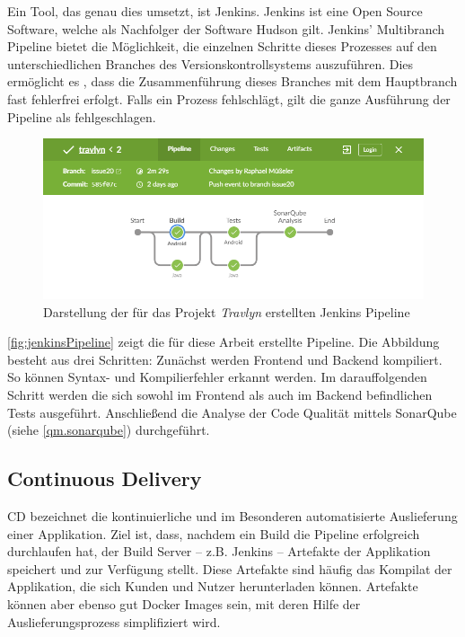 			Ein Tool, das genau dies umsetzt, ist Jenkins. Jenkins ist eine Open Source Software, welche als Nachfolger der Software Hudson gilt. Jenkins' Multibranch Pipeline bietet die Möglichkeit, die einzelnen Schritte dieses Prozesses auf den unterschiedlichen Branches des Versionskontrollsystems auszuführen. Dies ermöglicht es \zB, dass die Zusammenführung dieses Branches mit dem Hauptbranch fast fehlerfrei erfolgt. Falls ein Prozess fehlschlägt, gilt die ganze Ausführung der Pipeline als fehlgeschlagen. \cite{CloudBees.322020}
			
			\begin{figure}[ht!]
				\centering
				\includegraphics[width=1\textwidth]{images/jenkins-pipeline.png}
				\caption{Darstellung der für das Projekt \textit{Travlyn} erstellten Jenkins Pipeline}
				\label{fig:jenkinsPipeline}
			\end{figure} 
		
			\autoref{fig:jenkinsPipeline} zeigt die für diese Arbeit erstellte Pipeline. Die Abbildung besteht aus drei Schritten: Zunächst werden Frontend und Backend kompiliert. So können Syntax- und Kompilierfehler erkannt werden. Im darauffolgenden Schritt werden die sich sowohl im Frontend als auch im Backend befindlichen Tests ausgeführt. Anschließend die Analyse der Code Qualität mittels SonarQube (siehe \autoref{qm.sonarqube}) durchgeführt. 
			
			
		\newpage
		
		\subsection{Continuous Delivery}
		\label{qm.continuous_delivery}
		
			\ac{CD} bezeichnet die kontinuierliche und im Besonderen automatisierte Auslieferung einer Applikation. Ziel ist, dass, nachdem ein Build die Pipeline erfolgreich durchlaufen hat, der Build Server -- z.B. Jenkins -- Artefakte der Applikation speichert und zur Verfügung stellt. Diese Artefakte sind häufig das Kompilat der Applikation, die sich Kunden und Nutzer herunterladen können. Artefakte können aber ebenso gut Docker Images sein, mit deren Hilfe der Auslieferungsprozess simplifiziert wird. \cite{Humble.2011}                                         
	